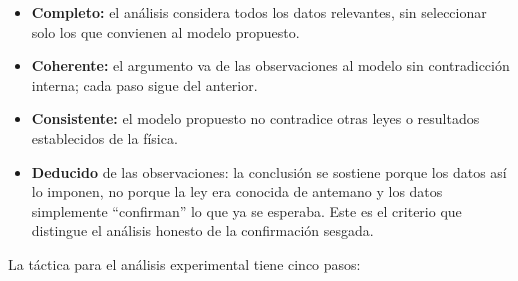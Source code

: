 \documentclass[11pt]{book}
\begin{document}
\begin{itemize}
    \item {\bf Completo:} el análisis considera todos los datos relevantes, sin seleccionar solo los que convienen al modelo propuesto.
    \item {\bf Coherente:} el argumento va de las observaciones al modelo sin contradicción interna; cada paso sigue del anterior.
    \item {\bf Consistente:} el modelo propuesto no contradice otras leyes o resultados establecidos de la física.
    \item {\bf Deducido} de las observaciones: la conclusión se sostiene porque los datos así lo imponen, no porque la ley era conocida de antemano y los datos simplemente ``confirman'' lo que ya se esperaba. Este es el criterio que distingue el análisis honesto de la confirmación sesgada.
\end{itemize}

\medskip
La táctica para el análisis experimental tiene cinco pasos:
\end{document}
